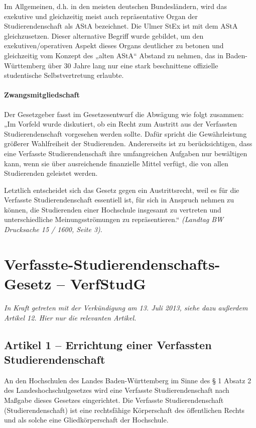 \documentclass[
10pt,
a4paper,
twoside,								%
titlepage=false,							%
draft=false								%
]{scrartcl}
\begin{document}
Im Allgemeinen, d.h. in den meisten deutschen Bundesländern, wird das exekutive und gleichzeitig meist auch repräsentative Organ der Studierendenschaft als AStA bezeichnet. Die Ulmer StEx ist mit dem AStA gleichzusetzen. Dieser alternative Begriff wurde gebildet, um den exekutiven/operativen Aspekt dieses Organs deutlicher zu betonen und gleichzeitig vom Konzept des „alten AStA“ Abstand zu nehmen, das in Baden-Württemberg über 30 Jahre lang nur eine stark beschnittene offizielle studentische Selbstvertretung erlaubte.



\paragraph{Zwangsmitgliedschaft}
Der Gesetzgeber fasst im Gesetzesentwurf die Abwägung wie folgt zusammen: „Im Vorfeld wurde diskutiert, ob ein Recht zum Austritt aus der Verfassten Studierendenschaft vorgesehen werden sollte. Dafür spricht die Gewährleistung größerer Wahlfreiheit der Studierenden. Andererseits ist zu berücksichtigen, dass eine Verfasste Studierendenschaft ihre umfangreichen Aufgaben nur bewältigen kann, wenn sie über ausreichende finanzielle Mittel verfügt, die von allen Studierenden geleistet werden.

Letztlich entscheidet sich das Gesetz gegen ein Austrittsrecht, weil es für die Verfasste Studierendenschaft essentiell ist, für sich in Anspruch nehmen zu können, die Studierenden einer Hochschule insgesamt zu vertreten und unterschiedliche
Meinungsströmungen zu repräsentieren.“ \textit{(Landtag BW Drucksache 15 / 1600, Seite 3)}.



\appendix

\newpage
\section{Verfasste-Studierendenschafts-Gesetz – VerfStudG}

\emph{In Kraft getreten mit der Verkündigung am 13. Juli 2013, siehe dazu außerdem Artikel 12. Hier nur die relevanten Artikel.}

\subsection{Artikel 1 – Errichtung einer Verfassten Studierendenschaft}

An den Hochschulen des Landes Baden-Württemberg im Sinne des § 1 Absatz 2 des Landeshochschulgesetzes wird eine Verfasste Studierendenschaft 
nach Maßgabe dieses Gesetzes eingerichtet. Die Verfasste Studierendenschaft (Studierendenschaft) ist eine rechtsfähige Körperschaft des öffentlichen Rechts und als solche eine Gliedkörperschaft der Hochschule.
\end{document}
